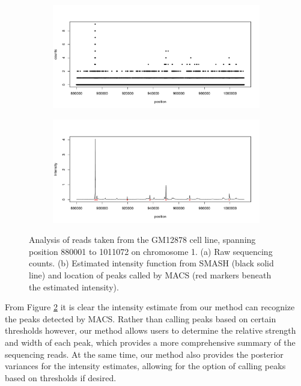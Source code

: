 \documentclass[12pt]{article}
\begin{document}
\begin{figure}[h]
\centering
    \begin{subfigure}[b]{0.85\textwidth}
        \centering
        \includegraphics[width=\textwidth]{peaks_comp_a.pdf}
        \caption{}
        \label{fig:seq_peak_data}
    \end{subfigure}

    \begin{subfigure}[b]{0.85\textwidth}
        \centering
        \includegraphics[width=\textwidth]{peaks_comp_b.pdf}
        \caption{}
        \label{fig:seq_peak_est}
    \end{subfigure}
    \caption{Analysis of reads taken from the GM12878 cell line, spanning position 880001 to 1011072 on chromosome 1. (a) Raw sequencing counts. (b) Estimated intensity function from SMASH (black solid line) and location of peaks called by MACS (red markers beneath the estimated intensity).}
    \label{fig:seq_peak}
\end{figure}
From Figure \ref{fig:seq_peak_est} it is clear the intensity estimate from our method can recognize the peaks detected by MACS. Rather than calling peaks based on certain thresholds however, our method allows users to determine the relative strength and width of each peak, which provides a more comprehensive summary of the sequencing reads. At the same time, our method also provides the posterior variances for the intensity estimates, allowing for the option of calling peaks based on thresholds if desired.\\
\end{document}
